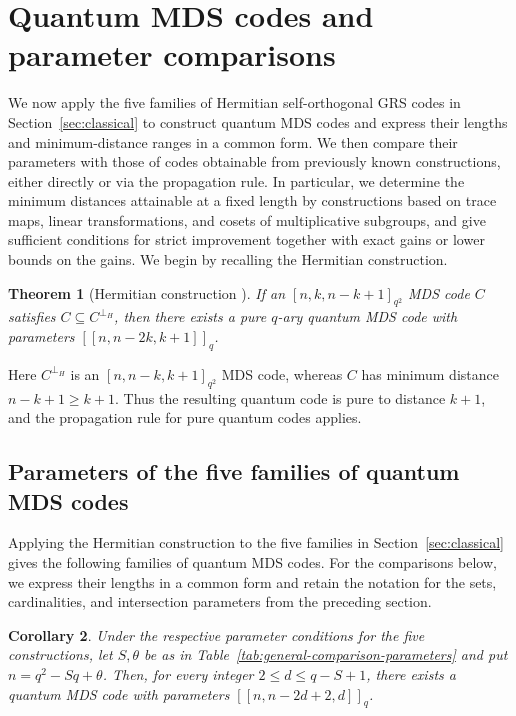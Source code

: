 \documentclass[preprint,12pt,a4paper]{elsarticle}
\newtheorem{theorem}{Theorem}[section]
\newtheorem{corollary}[theorem]{Corollary}
\newcommand{\qcode}[3]{\left[\!\left[#1,#2,#3\right]\!\right]_q}
\begin{document}
\section{Quantum MDS codes and parameter comparisons}\label{sec:quantum}\label{sec:comparison}

We now apply the five families of Hermitian self-orthogonal GRS codes in Section~\ref{sec:classical} to construct quantum MDS codes and express their lengths and minimum-distance ranges in a common form. We then compare their parameters with those of codes obtainable from previously known constructions, either directly or via the propagation rule. In particular, we determine the minimum distances attainable at a fixed length by constructions based on trace maps, linear transformations, and cosets of multiplicative subgroups, and give sufficient conditions for strict improvement together with exact gains or lower bounds on the gains. We begin by recalling the Hermitian construction.

\begin{theorem}[Hermitian construction \cite{AshikhminKnill2001,KetkarEtAl2006}]\label{thm:hermitian}
If an \mbox{$[n,k,n-k+1]_{q^2}$} MDS code $C$ satisfies $C\subseteq C^{\perp_H}$, then there exists a pure $q$-ary quantum MDS code with parameters $\qcode{n}{n-2k}{k+1}$.
\end{theorem}

Here $C^{\perp_H}$ is an $[n,n-k,k+1]_{q^2}$ MDS code, whereas $C$ has minimum distance $n-k+1\ge k+1$. Thus the resulting quantum code is pure to distance $k+1$, and the propagation rule for pure quantum codes applies.

\subsection{Parameters of the five families of quantum MDS codes}\label{subsec:quantum-families}

Applying the Hermitian construction to the five families in Section~\ref{sec:classical} gives the following families of quantum MDS codes. For the comparisons below, we express their lengths in a common form and retain the notation for the sets, cardinalities, and intersection parameters from the preceding section.

\begin{corollary}\label{cor:quantum-families}
Under the respective parameter conditions for the five constructions, let $S,\theta$ be as in Table~\ref{tab:general-comparison-parameters} and put $n=q^2-Sq+\theta$. Then, for every integer $2\le d\le q-S+1$, there exists a quantum MDS code with parameters $\qcode{n}{n-2d+2}{d}$.
\end{corollary}
\end{document}
